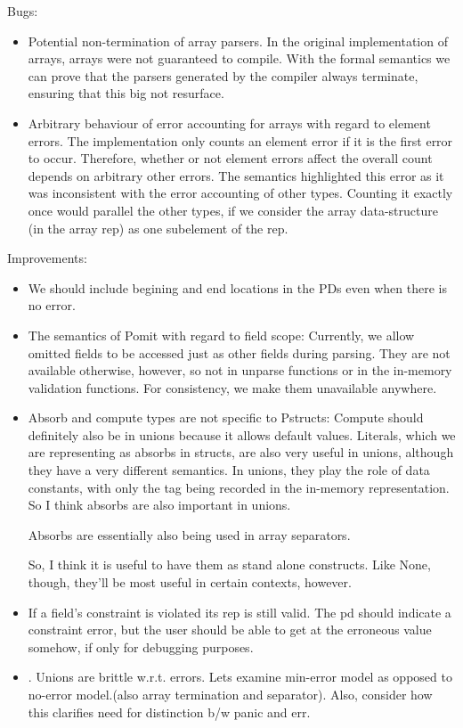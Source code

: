 Bugs:
\begin{itemize}
\item Potential non-termination of array parsers. In the original
  implementation of \pads{} arrays, arrays were not guaranteed to
  compile. With the formal semantics we can prove that the parsers
  generated by the compiler always terminate, ensuring that this big
  not resurface.

\item Arbitrary behaviour of error accounting for arrays with regard
  to element errors. The implementation only counts an element error
  if it is the first error to occur. Therefore, whether or not element
  errors affect the overall count depends on arbitrary other errors.
  The semantics highlighted this error as it was inconsistent with the
  error accounting of other types. Counting it exactly once would
  parallel the other types, if we consider the array data-structure
  (in the array rep) as one subelement of the rep.
\end{itemize} 

Improvements:
\begin{itemize}
\item We should include begining and end locations in the PDs even when there
   is no error.

 \item The semantics of Pomit with regard to field scope: Currently,
   we allow omitted fields to be accessed just as other fields during
   parsing.  They are not available otherwise, however, so not in
   unparse functions or in the in-memory validation functions. For
   consistency, we make them unavailable anywhere.

 \item Absorb and compute types are not specific to Pstructs:
   Compute should definitely also be in unions because it allows
   default values.  Literals, which we are representing as absorbs in
   structs, are also very useful in unions, although they have a very
   different semantics.  In unions, they play the role of data
   constants, with only the tag being recorded in the in-memory
   representation.  So I think absorbs are also important in unions.

   Absorbs are essentially also being used in array separators.

   So, I think it is useful to have them as stand alone constructs.  Like
   None, though, they'll be most useful in certain contexts, however.

 \item If a field's constraint is violated its rep is still valid.
   The pd should indicate a constraint error, but the user should be
   able to get at the erroneous value somehow, if only for debugging
   purposes.

 \item. Unions are brittle w.r.t. errors. Lets examine min-error model
   as opposed to no-error model.(also array termination and
   separator). Also, consider how this clarifies need for distinction
   b/w panic and err.
\end{itemize}

